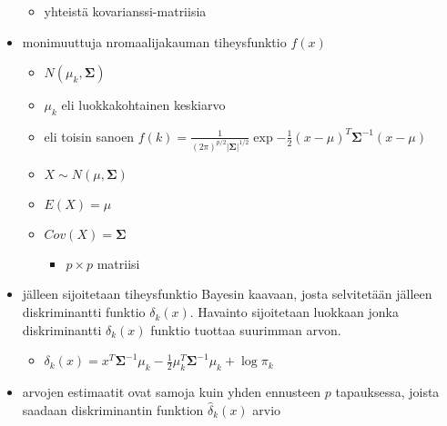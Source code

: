 \begin{itemize}
\begin{itemize}
        \item yhteistä kovarianssi-matriisia
    \end{itemize}
    \item monimuuttuja nromaalijakauman tiheysfunktio $f(x)$
    \begin{itemize}
        \item $N(\mu_k, \pmb{\Sigma})$
        \item $\mu_k$ eli luokkakohtainen keskiarvo
        \item eli toisin sanoen $f(k) = \frac{1}{(2\pi)^{p/2} |\pmb{\Sigma}|^{1/2}} \exp{-\frac{1}{2} (x - \mu)^T \pmb{\Sigma}^{-1} (x - \mu)}$
        \item $X \sim N(\mu, \pmb{\Sigma})$
        \item $E(X) = \mu$
        \item $Cov(X) = \pmb{\Sigma}$
        \begin{itemize}
            \item $p \times p$ matriisi
        \end{itemize}
    \end{itemize}
    \item jälleen sijoitetaan tiheysfunktio Bayesin kaavaan, josta selvitetään jälleen diskriminantti funktio $\delta_k(x)$. Havainto sijoitetaan luokkaan jonka diskriminantti $\delta_k(x)$ funktio tuottaa suurimman arvon.
    \begin{itemize}
        \item $\delta_k(x) = x^T \pmb{\Sigma}^{-1} \mu_k - \frac{1}{2} \mu_k^T \pmb{\Sigma}^{-1} \mu_k + \log \pi_k$
    \end{itemize}
    \item arvojen estimaatit ovat samoja kuin yhden ennusteen $p$ tapauksessa, joista saadaan diskriminantin funktion $\hat{\delta}_k(x)$ arvio
\end{itemize}


